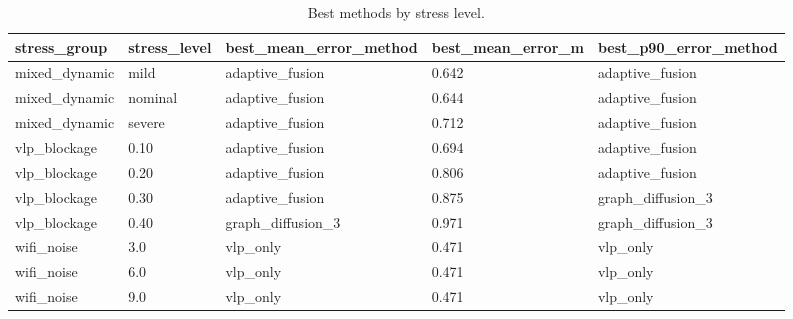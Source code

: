 \begin{table}[t]
\centering
\small
\caption{Best methods by stress level.}
\label{tab:stress_best}
\begin{tabular}{lllll}
\toprule
stress\_group & stress\_level & best\_mean\_error\_method & best\_mean\_error\_m & best\_p90\_error\_method \\
\midrule
mixed\_dynamic & mild & adaptive\_fusion & 0.642 & adaptive\_fusion \\
mixed\_dynamic & nominal & adaptive\_fusion & 0.644 & adaptive\_fusion \\
mixed\_dynamic & severe & adaptive\_fusion & 0.712 & adaptive\_fusion \\
vlp\_blockage & 0.10 & adaptive\_fusion & 0.694 & adaptive\_fusion \\
vlp\_blockage & 0.20 & adaptive\_fusion & 0.806 & adaptive\_fusion \\
vlp\_blockage & 0.30 & adaptive\_fusion & 0.875 & graph\_diffusion\_3 \\
vlp\_blockage & 0.40 & graph\_diffusion\_3 & 0.971 & graph\_diffusion\_3 \\
wifi\_noise & 3.0 & vlp\_only & 0.471 & vlp\_only \\
wifi\_noise & 6.0 & vlp\_only & 0.471 & vlp\_only \\
wifi\_noise & 9.0 & vlp\_only & 0.471 & vlp\_only \\
\bottomrule
\end{tabular}
\end{table}
